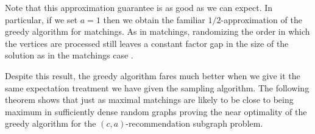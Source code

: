 Note that this approximation guarantee is as good as we can expect.
In particular, if we set $a=1$ then we obtain the familiar
$1/2$-approximation of the greedy algorithm for matchings. 
As in matchings, randomizing the order in
which the vertices are processed still leaves a constant factor gap
in the size of the solution as in the matchings case \cite{KarpVaziraniVazirani1990}.
\vs


Despite this result, the greedy algorithm fares much better when we
give it the same expectation treatment we have given the sampling
algorithm. The following theorem shows that just as maximal matchings
are likely to be close to being maximum in sufficiently dense random
graphs proving the near optimality of the greedy algorithm for the
$(c, a)$-recommendation subgraph problem.

